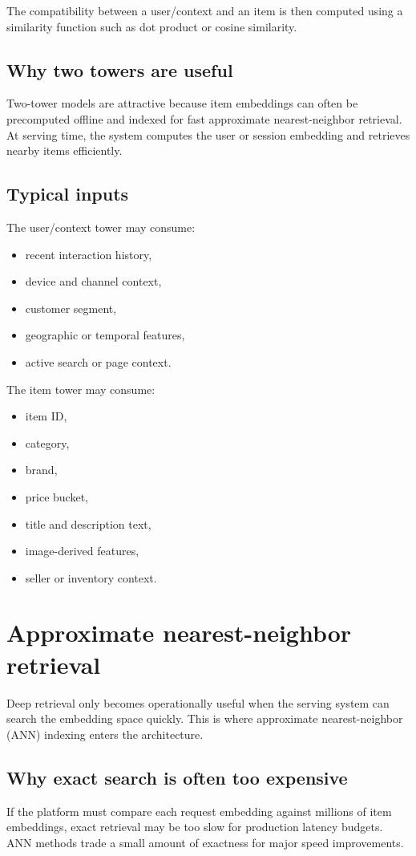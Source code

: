 The compatibility between a user/context and an item is then computed using a similarity function such as dot product or cosine similarity.

\subsection{Why two towers are useful}
Two-tower models are attractive because item embeddings can often be precomputed offline and indexed for fast approximate nearest-neighbor retrieval.
At serving time, the system computes the user or session embedding and retrieves nearby items efficiently.

\subsection{Typical inputs}
The user/context tower may consume:
\begin{itemize}
  \item recent interaction history,
  \item device and channel context,
  \item customer segment,
  \item geographic or temporal features,
  \item active search or page context.
\end{itemize}

The item tower may consume:
\begin{itemize}
  \item item ID,
  \item category,
  \item brand,
  \item price bucket,
  \item title and description text,
  \item image-derived features,
  \item seller or inventory context.
\end{itemize}

\section{Approximate nearest-neighbor retrieval}
Deep retrieval only becomes operationally useful when the serving system can search the embedding space quickly.
This is where approximate nearest-neighbor (ANN) indexing enters the architecture.

\subsection{Why exact search is often too expensive}
If the platform must compare each request embedding against millions of item embeddings, exact retrieval may be too slow for production latency budgets.
ANN methods trade a small amount of exactness for major speed improvements.

